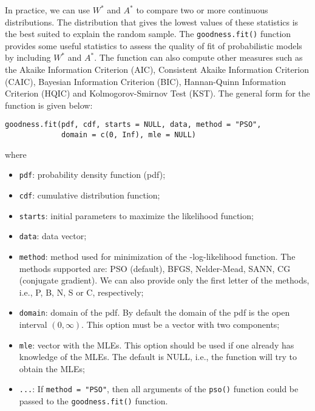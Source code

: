 \documentclass[10pt,letterpaper]{article}
\begin{document}
In practice, we can use $W^*$ and $A^*$ to compare two or more continuous distributions.
The distribution that gives the lowest values
of these statistics is the best suited to explain the random sample.
The \texttt{goodness.fit()} function provides some useful statistics to assess the quality
of fit of pro\-ba\-bi\-lis\-tic models by including $W^*$ and $A^*$.
The function can also compute other measures such as the Akaike Information
Criterion (AIC), Consistent Akaike Information Criterion (CAIC), Bayesian Information Criterion (BIC), Hannan-Quinn Information Criterion (HQIC)
and Kolmogorov-Smirnov Test (KST).
The general form for the function is given below:

\begin{verbatim}
goodness.fit(pdf, cdf, starts = NULL, data, method = "PSO",
             domain = c(0, Inf), mle = NULL)
\end{verbatim}
where
\begin{itemize}

\item
\texttt{pdf}: probability density function (pdf);

\item
\texttt{cdf}: cumulative distribution function;

\item
\texttt{starts}: initial parameters to maximize the likelihood function;

\item
\texttt{data}: data vector;

\item
\texttt{method}: method used for minimization of the -log-likelihood function.
The methods supported are: PSO (default), BFGS, Nelder-Mead, SANN, CG (conjugate gradient).
We can also provide only the first letter of the methods, i.e., P, B, N, S or C, respectively;

\item
\texttt{domain}: domain of the pdf.
By default the domain of the pdf is the open interval $(0, \infty)$.
This option must be a vector with two components;

\item
\texttt{mle}: vector with the MLEs.
This option should be used if one already has knowledge of the MLEs.
The default is NULL, i.e., the function will try to obtain the MLEs;

\item
\texttt{...}: If \texttt{method = "PSO"}, then all arguments of the \texttt{pso()} function could be passed to the \texttt{goodness.fit()} function.

\end{itemize}
\end{document}
